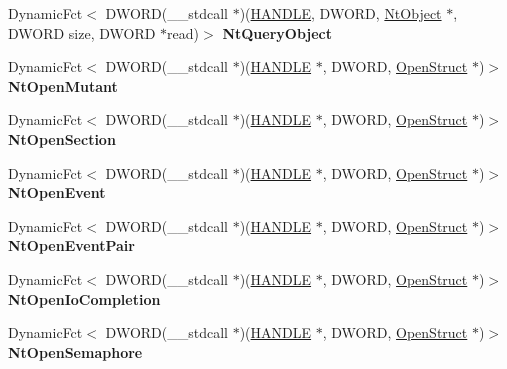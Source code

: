 \begin{DoxyCompactItemize}
\mbox{\label{struct_n_t_d_l_l_ac60da936969949ed444bb0ba9f648cb5}} 
Dynamic\+Fct$<$ D\+W\+O\+RD(\+\_\+\+\_\+stdcall $\ast$)(\hyperlink{interfacevoid}{H\+A\+N\+D\+LE}, D\+W\+O\+RD, \hyperlink{struct_nt_object}{Nt\+Object} $\ast$, D\+W\+O\+RD size, D\+W\+O\+RD $\ast$read)$>$ {\bfseries Nt\+Query\+Object}
\item 
\mbox{\label{struct_n_t_d_l_l_a8fdfe0e91f8024b819900aa11555caa0}} 
Dynamic\+Fct$<$ D\+W\+O\+RD(\+\_\+\+\_\+stdcall $\ast$)(\hyperlink{interfacevoid}{H\+A\+N\+D\+LE} $\ast$, D\+W\+O\+RD, \hyperlink{struct_open_struct}{Open\+Struct} $\ast$)$>$ {\bfseries Nt\+Open\+Mutant}
\item 
\mbox{\label{struct_n_t_d_l_l_aa306707116ffe9033063014398026ab4}} 
Dynamic\+Fct$<$ D\+W\+O\+RD(\+\_\+\+\_\+stdcall $\ast$)(\hyperlink{interfacevoid}{H\+A\+N\+D\+LE} $\ast$, D\+W\+O\+RD, \hyperlink{struct_open_struct}{Open\+Struct} $\ast$)$>$ {\bfseries Nt\+Open\+Section}
\item 
\mbox{\label{struct_n_t_d_l_l_a3c4c859d99ecc8eabed3d58d58d23045}} 
Dynamic\+Fct$<$ D\+W\+O\+RD(\+\_\+\+\_\+stdcall $\ast$)(\hyperlink{interfacevoid}{H\+A\+N\+D\+LE} $\ast$, D\+W\+O\+RD, \hyperlink{struct_open_struct}{Open\+Struct} $\ast$)$>$ {\bfseries Nt\+Open\+Event}
\item 
\mbox{\label{struct_n_t_d_l_l_ae77ce4e9b2591bf7ea46ee88c49fbf6b}} 
Dynamic\+Fct$<$ D\+W\+O\+RD(\+\_\+\+\_\+stdcall $\ast$)(\hyperlink{interfacevoid}{H\+A\+N\+D\+LE} $\ast$, D\+W\+O\+RD, \hyperlink{struct_open_struct}{Open\+Struct} $\ast$)$>$ {\bfseries Nt\+Open\+Event\+Pair}
\item 
\mbox{\label{struct_n_t_d_l_l_a6eee74053104884248b8d35e98189383}} 
Dynamic\+Fct$<$ D\+W\+O\+RD(\+\_\+\+\_\+stdcall $\ast$)(\hyperlink{interfacevoid}{H\+A\+N\+D\+LE} $\ast$, D\+W\+O\+RD, \hyperlink{struct_open_struct}{Open\+Struct} $\ast$)$>$ {\bfseries Nt\+Open\+Io\+Completion}
\item 
\mbox{\label{struct_n_t_d_l_l_a062e31b1fa43f111c2d1414b9620c311}} 
Dynamic\+Fct$<$ D\+W\+O\+RD(\+\_\+\+\_\+stdcall $\ast$)(\hyperlink{interfacevoid}{H\+A\+N\+D\+LE} $\ast$, D\+W\+O\+RD, \hyperlink{struct_open_struct}{Open\+Struct} $\ast$)$>$ {\bfseries Nt\+Open\+Semaphore}

\end{DoxyCompactItemize}
